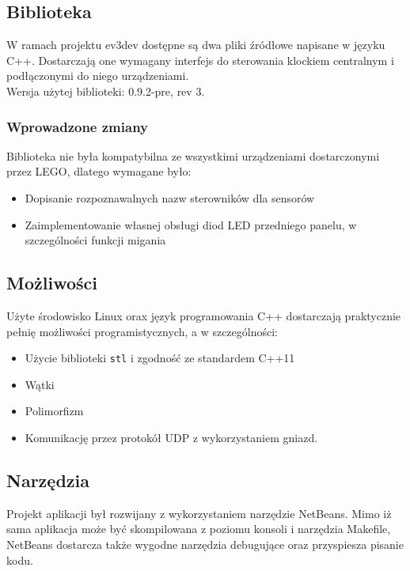 \subsection{Biblioteka}
W ramach projektu ev3dev dostępne są dwa pliki źródłowe napisane w języku C++. Dostarczają one wymagany interfejs do sterowania klockiem centralnym i podłączonymi do niego urządzeniami.\\

\noindent Wersja użytej biblioteki: 0.9.2-pre, rev 3.

\subsubsection{Wprowadzone zmiany}
Biblioteka nie była kompatybilna ze wszystkimi urządzeniami dostarczonymi przez LEGO, dlatego wymagane było:
\begin{itemize}
    \item Dopisanie rozpoznawalnych nazw sterowników dla sensorów
    \item Zaimplementowanie własnej obsługi diod LED przedniego panelu, w szczególności funkcji migania
\end{itemize}

\subsection{Możliwości}
Użyte środowisko Linux orax język programowania C++ dostarczają praktycznie pełnię możliwości programistycznych, a w szczególności:
\begin{itemize}
    \item Użycie biblioteki {\tt stl} i zgodność ze standardem C++11
    \item Wątki
    \item Polimorfizm
    \item Komunikację przez protokół UDP z wykorzystaniem gniazd.
\end{itemize}

\subsection{Narzędzia}
Projekt aplikacji był rozwijany z wykorzystaniem narzędzie NetBeans. Mimo iż sama aplikacja może być skompilowana z poziomu konsoli i narzędzia Makefile, NetBeans dostarcza także wygodne narzędzia debugujące oraz przyspiesza pisanie kodu.

